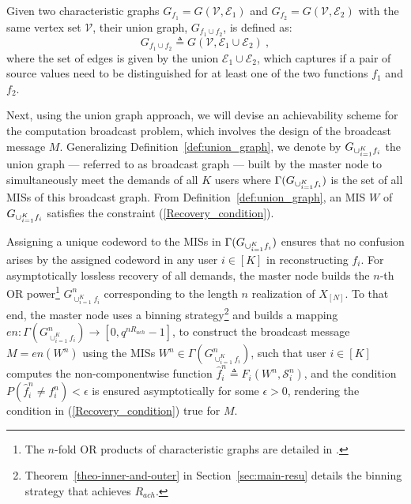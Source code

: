 \documentclass[conference, letterpaper]{IEEEtran} %
\begin{document}
\begin{defi}
\label{def:union_graph}
Given two characteristic graphs  $G_{f_1} =G(\mathcal{V}, \mathcal{E}_1)$ and $G_{f_{2}}=G(\mathcal{V}, \mathcal{E}_2)$ with the same vertex set $\mathcal{V}$, their union graph,  $G_{f_{1}\cup f_2}$, is defined as:
\begin{equation}
\label{Union_graph_def_eq}
    G_{f_{1}\cup f_2} \triangleq G(\mathcal{V}, \mathcal{E}_{1}\cup \mathcal{E}_{2})\ ,
\end{equation}
where the set of edges is given by the union $\mathcal{E}_{1}\cup \mathcal{E}_{2}$, which captures if a pair of source values need to be distinguished for at least one of the two functions $f_1$ and $f_2$.
\end{defi}






Next, using the union graph approach, we will devise an achievability scheme for the computation broadcast problem, which involves the design of the broadcast message $M$. Generalizing Definition~\ref{def:union_graph}, we denote by $G_{\cup_{i=1}^{K}f_i}$ the union graph --- referred to as broadcast graph --- built by the master node to simultaneously meet the demands of all $K$ users where $\Gamma(G_{\cup_{i=1}^{K}f_i})$ is the set of all MISs of this broadcast graph. From Definition~\ref{def:union_graph}, an MIS $W$ of $G_{\cup_{i=1}^{K}f_i}$ satisfies the constraint (\ref{Recovery_condition}). 

Assigning a unique codeword to the MISs in $\Gamma(G_{\cup_{i=1}^{K}f_i})$ ensures that no confusion arises by the assigned codeword in any user $i\in[K]$ in reconstructing $f_{i}$. 
For asymptotically lossless recovery of all demands, the master node builds the $n$-th OR power\footnote{The $n$-fold OR products of characteristic graphs are detailed in \cite{AlonOrlit1996}.} $G^n_{\cup_{i=1}^{K} f_i}$ corresponding to the length $n$ realization of $X_{[N]}$. 
To that end, the master node uses a binning strategy\footnote{Theorem~\ref{theo-inner-and-outer} in Section~\ref{sec:main-resu} details the binning strategy that achieves $R_{ach}$.} and builds a mapping $en:\Gamma(G^n_{\cup_{i=1}^{K} f_i})\to [0, q^{nR_{ach}}-1]$,  %
to construct the broadcast message $M=en(W^n)$ using the MISs $W^n\in\Gamma(G^n_{\cup_{i=1}^{K} f_i})$, such that user $i\in [K]$ computes the non-componentwise function $\hat{f}_{i}^{n}\triangleq F_i(W^n, \mathcal{S}_{i}^{n})$, and the condition $P(\hat{f}_{i}^{n}\neq f_{i}^{n})<\epsilon$ is ensured asymptotically for some $\epsilon>0$, rendering the condition in (\ref{Recovery_condition}) true for $M$.
\end{document}
